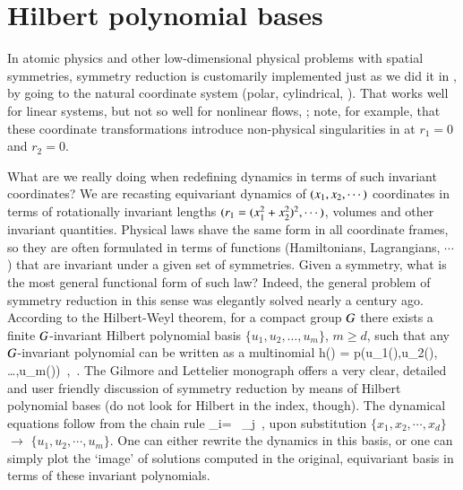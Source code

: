 \documentclass[preprint,number,sort&compress]{elsarticle}
\begin{document}
\section{\label{s:Hilbert} Hilbert polynomial bases}

In atomic physics and other
low-dimensional physical problems with spatial symmetries,
symmetry reduction is customarily implemented just as we
did it in , by going to the natural
coordinate system (polar, cylindrical, \etc). That works well
for linear systems, but not so well for nonlinear flows,
;
note, for example, that these coordinate transformations
introduce non-physical singularities
in  at $r_1=0$ and $r_2=0$. 


What are we really doing when redefining dynamics in terms of
such invariant coordinates? We are recasting equivariant
dynamics of $(x_1,x_2,\cdots)$ coordinates in terms of
rotationally invariant lengths
$(r_1=(x_1^2+x_2^2)^2,\cdots)$, volumes and other
invariant quantities.
Physical laws shave the same form in
all coordinate frames, so they are often
formulated in terms of functions (Hamiltonians, Lagrangians,
$\cdots$) {that are} invariant under a given set of symmetries. Given a
symmetry, what is the most general functional form of such
law?
Indeed, the general problem of symmetry
reduction in this sense {was} elegantly solved nearly a century ago.
According to the Hilbert-Weyl theorem, for a compact
group $G$ there exists a finite $G${-invariant}
Hilbert polynomial basis $\{u_1,u_2, \dots,u_m\}$, $ m \geq
d$, such that any $G${-invariant} polynomial can be
written as a multinomial
\beq
h(\ssp) = p(u_1(\ssp),u_2(\ssp), \dots,u_m(\ssp))
    \,,\qquad \ssp \in \pS
\,.
{The} Gilmore and Lettelier monograph offers
a very clear, detailed and user friendly discussion of
symmetry reduction by means of Hilbert polynomial bases (do
not look for Hilbert in the index, though).
The dynamical equations follow from the chain rule
\beq
 _i= \, _j
 \,,
upon substitution $\{x_1,x_2,\cdots,x_d\}$ $\to$
$\{u_1,u_2,\cdots,u_m\}$. One can either rewrite the dynamics
in this basis, or one can simply plot the `image' of
solutions computed in the original, equivariant basis in
terms of these invariant polynomials.
\end{document}
